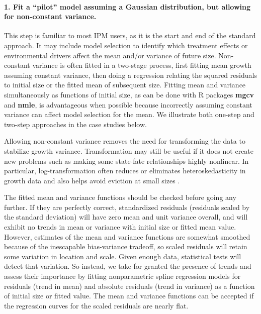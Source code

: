 \documentclass[12pt]{article}
\begin{document}
\begin{spacing}{1.9}
\paragraph{1. Fit a ``pilot'' model assuming a Gaussian distribution, but allowing for non-constant variance.}
This step is familiar to most IPM users, as it is the start and end of the standard approach. 
It may include model selection to identify which treatment effects or environmental drivers affect the mean and/or variance of future size. 
Non-constant variance is often fitted in a two-stage process, first fitting mean growth assuming constant variance, then doing a regression relating the squared residuals to initial size or the fitted mean of subsequent size. 
Fitting mean and variance simultaneously as functions of initial size, as can be done with R packages \textbf{mgcv} and \textbf{nmle}, is advantageous when possible because incorrectly assuming constant variance can affect model selection for the mean. 
We illustrate both one-step and two-step approaches in the case studies below. 

Allowing non-constant variance removes the need for transforming the data to stabilize growth variance. 
Transformation may still be useful if it does not create new problems such as making some state-fate
relationships highly nonlinear. %
In particular, log-transformation often reduces or eliminates heteroskedasticity in growth data \citep{ellner-etal-2016} 
and also helps avoid eviction at small sizes \citep{williams2012avoiding}. 

The fitted mean and variance functions should be checked before going any further. 
If they are perfectly correct, standardized residuals (residuals scaled by the standard deviation) will have zero mean and unit variance overall, and will exhibit no trends in mean or variance with initial size or fitted mean value. 
However, estimates of the mean and variance functions are somewhat smoothed because of the inescapable bias-variance tradeoff, so scaled residuals will retain some variation in location and scale. 
Given enough data, statistical tests will detect that variation.  
So instead, we take for granted the presence of trends and assess their importance by fitting nonparametric spline regression models for residuals (trend in mean) and absolute residuals (trend in variance) as a function of initial size or fitted value. 
The mean and variance functions can be accepted if the regression curves for the scaled residuals are nearly flat. 


\end{spacing}
\end{document}
